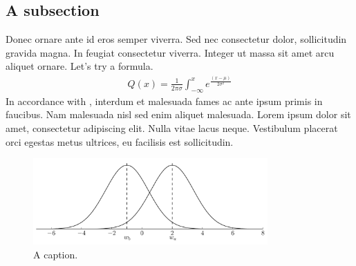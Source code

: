 \documentclass[12pt,a4paper,oneside]{article}
\begin{document}
\subsection{A subsection}

Donec ornare ante id eros semper viverra. Sed nec consectetur dolor,
sollicitudin gravida magna. In feugiat consectetur viverra. Integer ut massa sit
amet arcu aliquet ornare. Let's try a formula.
\begin{align*}
Q(x) = \frac{1}{2 \pi \sigma} \int_{- \infty}^{x} e^{\tfrac{(x - \mu)}{2
\sigma^2}}
\end{align*}
In accordance with \citet[p.~185]{seeger2013pattern}, interdum et malesuada
fames ac ante ipsum primis in faucibus. Nam malesuada nisl sed enim aliquet
malesuada.  Lorem ipsum dolor sit amet, consectetur adipiscing elit. Nulla vitae
lacus neque. Vestibulum placerat orci egestas metus ultrices, eu facilisis est
sollicitudin.

\begin{figure}[t]
  \centering
  \includegraphics[width=0.8\textwidth]{thurstone.pdf}
  \caption{A caption.}
  \label{fig:example}
\end{figure}

 
\end{document}

